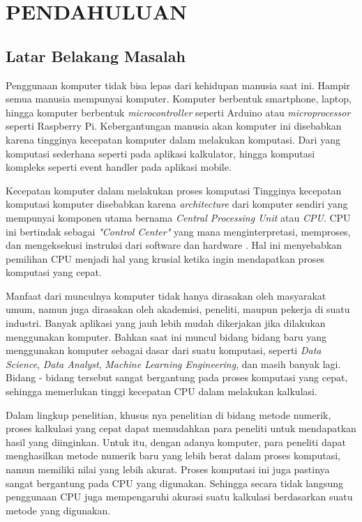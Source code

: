 \chapter{PENDAHULUAN}
\setcounter{page}{1}
\section{Latar Belakang Masalah}
\label{latarbelakang}


Penggunaan komputer tidak bisa lepas dari kehidupan manusia saat ini. Hampir
semua manusia mempunyai komputer. Komputer berbentuk smartphone, laptop, hingga komputer
berbentuk \emph{microcontroller} seperti Arduino atau \emph{microprocessor} seperti
Raspberry Pi. Kebergantungan manusia akan komputer ini disebabkan karena
tingginya kecepatan komputer dalam melakukan komputasi. Dari yang komputasi sederhana
seperti pada aplikasi kalkulator, hingga komputasi kompleks seperti event
handler pada aplikasi mobile.


Kecepatan komputer dalam melakukan proses komputasi Tingginya kecepatan komputasi
komputer disebabkan karena \emph{architecture} dari komputer sendiri yang
mempunyai komponen utama bernama \emph{Central Processing Unit} atau \emph{CPU}.
CPU ini bertindak sebagai \emph{"Control Center"} yang mana menginterpretasi, memproses,
dan mengeksekusi instruksi dari software dan hardware \citep{armWhatCentralProcessing2023}.
Hal ini menyebabkan pemilihan CPU menjadi hal yang krusial ketika ingin
mendapatkan proses komputasi yang cepat.


Manfaat dari munculnya komputer tidak hanya dirasakan oleh masyarakat umum,
namun juga dirasakan oleh akademisi, peneliti, maupun pekerja di suatu industri.
Banyak aplikasi yang jauh lebih mudah dikerjakan jika dilakukan menggunakan komputer.
Bahkan saat ini muncul bidang bidang baru yang menggunakan komputer sebagai
dasar dari suatu komputasi, seperti \emph{Data Science}, \emph{Data Analyst}, \emph{Machine
Learning Engineering}, dan masih banyak lagi. Bidang - bidang tersebut sangat
bergantung pada proses komputasi yang cepat, sehingga memerlukan tinggi kecepatan
CPU dalam melakukan kalkulasi.

Dalam lingkup penelitian, khusus nya penelitian di bidang metode numerik, proses
kalkulasi yang cepat dapat memudahkan para peneliti untuk mendapatkan hasil yang
diinginkan. Untuk itu, dengan adanya komputer, para peneliti dapat menghasilkan
metode numerik baru yang lebih berat dalam proses komputasi, namun memiliki nilai
yang lebih akurat. Proses komputasi ini juga pastinya sangat bergantung pada CPU
yang digunakan. Sehingga secara tidak langsung penggunaan CPU juga mempengaruhi akurasi
suatu kalkulasi berdasarkan suatu metode yang digunakan.

